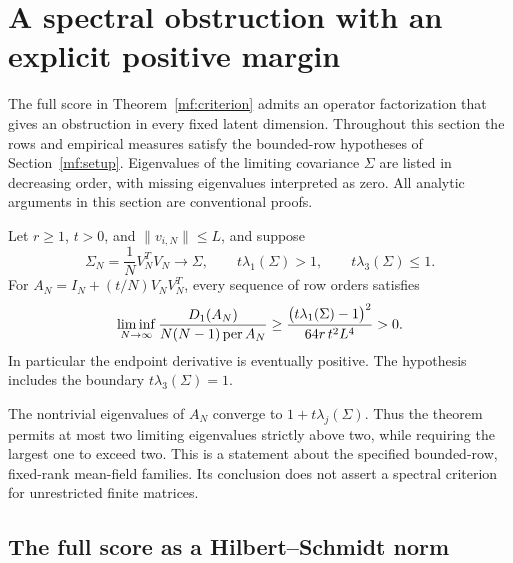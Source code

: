 
\section{A spectral obstruction with an explicit positive margin}
\label{sp:section}

The full score in Theorem~\ref{mf:criterion} admits an operator
factorization that gives an obstruction in every fixed latent dimension.
Throughout this section the rows and empirical measures satisfy the
bounded-row hypotheses of Section~\ref{mf:setup}. Eigenvalues of the
limiting covariance \(\Sigma\) are listed in decreasing order, with
missing eigenvalues interpreted as zero. All analytic arguments in
this section are conventional proofs.

\begin{theorem}
\label{sp:main}
Let \(r\ge1\), \(t>0\), and \(\|v_{i,N}\|\le L\), and suppose
\[
 \Sigma_N=\frac1N V_N^TV_N\longrightarrow\Sigma,\qquad
 t\lambda_1(\Sigma)>1,\qquad t\lambda_3(\Sigma)\le1.
\]
For \(A_N=I_N+(t/N)V_NV_N^T\), every sequence of row orders satisfies
\begin{equation}\label{sp:positive-margin}
 \liminf_{N\to\infty}
 \frac{D_1(A_N)}{N(N-1)\operatorname{per} A_N}
 \ge
 \frac{\bigl(t\lambda_1(\Sigma)-1\bigr)^2}{64r\,t^2L^4}>0.
\end{equation}
In particular the endpoint derivative is eventually positive.
The hypothesis includes the boundary \(t\lambda_3(\Sigma)=1\).
\end{theorem}

The nontrivial eigenvalues of \(A_N\) converge to
\(1+t\lambda_j(\Sigma)\). Thus the theorem permits at most two
limiting eigenvalues strictly above two, while requiring the largest
one to exceed two. This is a statement about the specified bounded-row,
fixed-rank mean-field families. Its conclusion does not assert a
spectral criterion for unrestricted finite matrices.

\subsection{The full score as a Hilbert--Schmidt norm}

